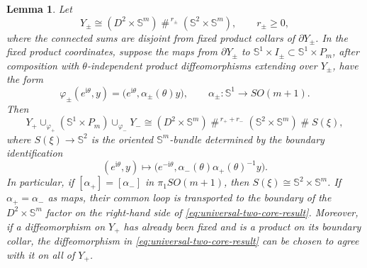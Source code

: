 \documentclass[11pt,reqno]{amsart}
\newtheorem{lemma}[theorem]{Lemma}
\theoremstyle{definition}
\numberwithin{equation}{section}
\begin{document}
\begin{lemma}\label{lem:universal-two-core}
Let
\[
 Y_\pm\cong
 (D^2\times\mathbb S^m)
 \mathbin{\#}^{\,r_\pm}(\mathbb S^2\times\mathbb S^m),
 \qquad r_\pm\ge0,
\]
where the connected sums are disjoint from fixed product collars of
\(\partial Y_\pm\).  In the fixed product coordinates, suppose the maps
from \(\partial Y_\pm\) to
\(\mathbb S^1\times I_\pm\subset\mathbb S^1\times P_m\), after
composition with \(\theta\)-independent product diffeomorphisms extending
over \(Y_\pm\), have the form
\begin{equation}\label{eq:universal-attaching-maps}
 \varphi_\pm(e^{\mathrm i\theta},y)
 =\bigl(e^{\mathrm i\theta},\alpha_\pm(\theta)y\bigr),
 \qquad
 \alpha_\pm:\mathbb S^1\longrightarrow SO(m+1).
\end{equation}
Then
\begin{equation}\label{eq:universal-two-core-result}
 Y_+\cup_{\varphi_+}(\mathbb S^1\times P_m)
 \cup_{\varphi_-}Y_-
 \cong
 (D^2\times\mathbb S^m)
 \mathbin{\#}^{\,r_++r_-}(\mathbb S^2\times\mathbb S^m)
 \mathbin{\#}S(\xi),
\end{equation}
where \(S(\xi)\to\mathbb S^2\) is the oriented
\(\mathbb S^m\)-bundle determined by the boundary identification
\begin{equation}\label{eq:universal-clutching-map}
 (e^{\mathrm i\theta},y)
 \longmapsto
 \bigl(e^{-\mathrm i\theta},
  \alpha_-(\theta)\alpha_+(\theta)^{-1}y\bigr).
\end{equation}
In particular, if \([\alpha_+]=[\alpha_-]\) in
\(\pi_1SO(m+1)\), then \(S(\xi)\cong\mathbb S^2\times\mathbb S^m\).
If \(\alpha_+=\alpha_-\) as maps, their common loop is transported to
the boundary of the \(D^2\times\mathbb S^m\) factor on the right-hand
side of \eqref{eq:universal-two-core-result}.
Moreover, if a diffeomorphism on \(Y_+\) has already been fixed and is
a product on its boundary collar, the diffeomorphism in
\eqref{eq:universal-two-core-result} can be chosen to agree with it on
all of \(Y_+\).
\end{lemma}
\end{document}
